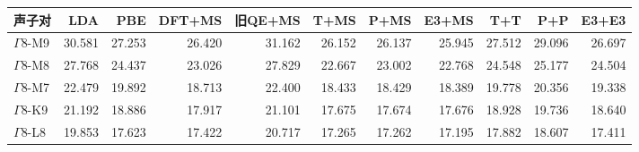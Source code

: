 \begin{tabular}{lrrrrrrrrrr}
\toprule
声子对 & LDA & PBE & DFT+MS & 旧QE+MS & T+MS & P+MS & E3+MS & T+T & P+P & E3+E3 \\
\midrule
$\Gamma$8-M9 & 30.581 & 27.253 & 26.420 & 31.162 & 26.152 & 26.137 & 25.945 & 27.512 & 29.096 & 26.697 \\
$\Gamma$8-M8 & 27.768 & 24.437 & 23.026 & 27.829 & 22.667 & 23.002 & 22.768 & 24.548 & 25.177 & 24.504 \\
$\Gamma$8-M7 & 22.479 & 19.892 & 18.713 & 22.400 & 18.433 & 18.429 & 18.389 & 19.778 & 20.356 & 19.338 \\
$\Gamma$8-K9 & 21.192 & 18.886 & 17.917 & 21.101 & 17.675 & 17.674 & 17.676 & 18.928 & 19.736 & 18.640 \\
$\Gamma$8-L8 & 19.853 & 17.623 & 17.422 & 20.717 & 17.265 & 17.262 & 17.195 & 17.882 & 18.607 & 17.411 \\
\bottomrule
\end{tabular}
